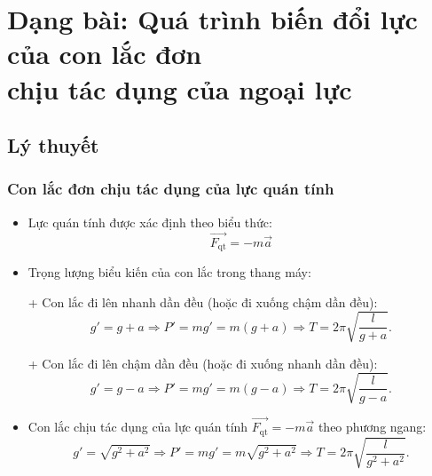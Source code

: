 
\chapter[Dạng bài: Quá trình biến đổi lực\\ của con lắc đơn chịu tác dụng\\ của ngoại lực]{Dạng bài: Quá trình biến đổi lực của con lắc đơn\\ chịu tác dụng của ngoại lực}
\section{Lý thuyết}
\subsection{Con lắc đơn chịu tác dụng của lực quán tính}
\begin{itemize}
	\item Lực quán tính được xác định theo biểu thức:
	\begin{equation*}
		\overrightarrow{F_{\text{qt}}} = - m \vec{a}
	\end{equation*}  
	\item Trọng lượng biểu kiến của con lắc trong thang máy:
	
	+ Con lắc đi lên nhanh dần đều (hoặc đi xuống chậm dần đều):
	\begin{equation*}
		g'=g+a \Rightarrow P' = mg' =m(g+a) \Rightarrow T = 2\pi \sqrt{\dfrac{l}{g+a}}.
	\end{equation*}
	
	+ Con lắc đi lên chậm dần đều (hoặc đi xuống nhanh dần đều):
	\begin{equation*}
		g'=g-a \Rightarrow P' = mg' =m(g-a) \Rightarrow T = 2\pi \sqrt{\dfrac{l}{g-a}}.
	\end{equation*}
	
	\item Con lắc chịu tác dụng của lực quán tính $\vec{F_{\text{qt}}} = - m \vec{a}$ theo phương ngang:
	\begin{equation*}
		g'=\sqrt{g^2+a^2} \Rightarrow P'=mg'=m\sqrt{g^2+a^2} \Rightarrow T=2\pi \sqrt{\dfrac{l}{g^2+a^2}}.
	\end{equation*}	 
\end{itemize}
